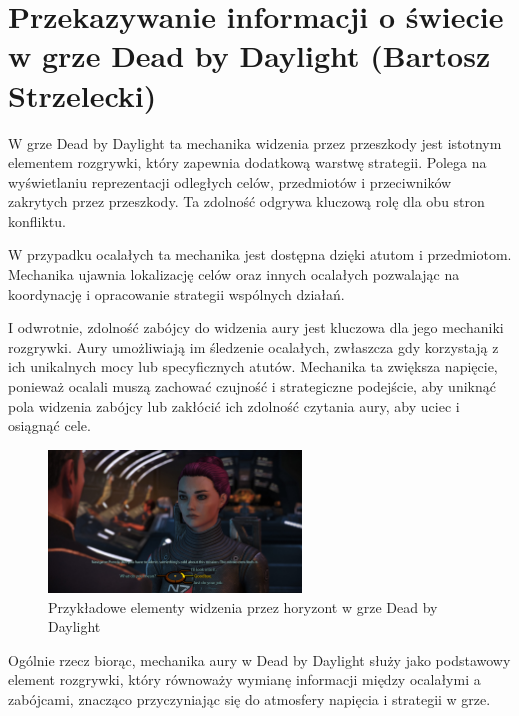 \section{Przekazywanie informacji o świecie w grze Dead by Daylight (Bartosz Strzelecki)}

W grze Dead by Daylight ta mechanika widzenia przez przeszkody jest istotnym elementem rozgrywki, który
zapewnia dodatkową warstwę strategii. Polega na wyświetlaniu reprezentacji odległych celów, przedmiotów i przeciwników
zakrytych przez przeszkody. Ta zdolność odgrywa kluczową rolę dla obu stron konfliktu.

W przypadku ocalałych ta mechanika jest dostępna dzięki atutom i przedmiotom. Mechanika ujawnia lokalizację celów oraz
innych ocalałych pozwalając na koordynację i opracowanie strategii wspólnych działań.

I odwrotnie, zdolność zabójcy do widzenia aury jest kluczowa dla jego mechaniki rozgrywki.
Aury umożliwiają im śledzenie ocalałych, zwłaszcza gdy korzystają z ich unikalnych mocy lub specyficznych atutów. 
Mechanika ta zwiększa napięcie, ponieważ ocalali muszą zachować czujność i strategiczne podejście, 
aby uniknąć pola widzenia zabójcy lub zakłócić ich zdolność czytania aury, aby uciec i osiągnąć cele.

\begin{figure}[h]
\centering
\includegraphics[width=0.6\textwidth]{images/me}
\caption{Przykładowe elementy widzenia przez horyzont w grze Dead by Daylight}
\end{figure}

Ogólnie rzecz biorąc, mechanika aury w Dead by Daylight służy jako podstawowy element rozgrywki,
który równoważy wymianę informacji między ocalałymi a zabójcami, znacząco przyczyniając się do atmosfery napięcia i strategii w grze.

